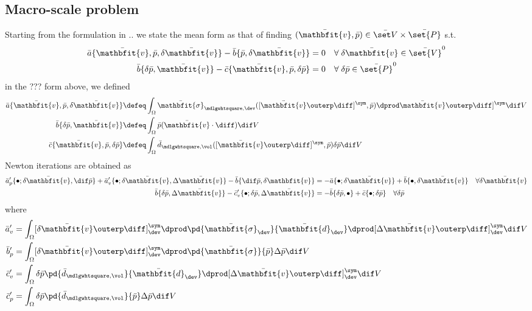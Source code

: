 \documentclass[a4paper,11pt]{article}
\renewcommand{\ta}[1]{\mathbfit{#1}}
\renewcommand{\ts}[1]{\mathbfit{#1}}
\renewcommand{\Box}{\mdlgwhtsquare}
\begin{document}
\subsection{Macro-scale problem}
Starting from the formulation in .. we state the mean form as that of finding $(\bar{\ta v},\bar p) \in \bar{\set V} \times \bar{\set{P}}$ s.t. 
\begin{align}
 \bar a\{\bar{\ta v},\bar p, \delta\bar{\ta v}\} - \bar b\{\bar p, \delta\bar{\ta v}\} &= 0   \quad \forall\; \delta\bar{\ta v} \in \bar{\set{V}}^0\\
 \bar b\{\delta\bar p, \bar{\ta v}\} - \bar c\{\bar{\ta v}, \bar p, \delta\bar p\}&= 0   \quad \forall\; \delta\bar p \in \bar{\set{P}}^0
\end{align}
in the ??? form above, we defined
\begin{align}
 \bar a\{\bar{\ta v},\bar p, \delta\bar{\ta v}\} &\defeq \int_\Omega \bar{\ts\sigma}_{\Box,\dev}([\bar{\ta v}\outerp \diff]^\sym,\bar p)\dprod \bar{\ta v}\outerp \diff]^\sym \dif V \\
 \bar b\{\delta\bar p, \bar{\ta v}\}             &\defeq \int_\Omega \bar p(\bar{\ta v}\cdot\diff)\dif V \\
 \bar c\{\bar{\ta v}, \bar p, \delta\bar p\}     &\defeq \int_\Omega \bar d_{\Box,\vol}([\bar{\ta v}\outerp \diff]^\sym,\bar p)\delta\bar p\dif V
\end{align}
Newton iterations are obtained as
\begin{align}
 \bar{a}'_p\{\bullet; \delta\bar{\ta v},\dif\bar{p}\} + \bar{a}'_v\{\bullet; \delta\bar{\ta v},\Delta\bar{\ta v}\} - \bar{b}\{\dif\bar p, \delta{\ta v}\} &= -\bar{a}\{\bullet; \delta\bar{\ta v}\} + \bar{b}\{\bullet, \delta\bar{\ta v}\}\quad \forall \delta\bar{\ta v}\\
\bar{b}\{\delta\bar p, \Delta\bar{\ta v}\} - \bar{c}'_v\{\bullet; \delta\bar{p}, \Delta\bar{ \ta v}\} &= -\bar{b}\{\delta\bar{p},\bullet\} + \bar{c}\{\bullet;\delta\bar{p}\}\quad \forall \delta\bar{p}
\end{align}
where
\begin{align}
 \bar{a}'_v &= \int_\Omega [\delta\bar{\ta v}\outerp\diff]^\sym_\dev \dprod \pd{\bar{\ts\sigma}_\dev}{\bar{\ts d}_\dev} \dprod [\Delta\bar{\ta v}\outerp\diff]^\sym_\dev \dif V\\
 \bar{b}'_p &= \int_\Omega [\delta\bar{\ta v}\outerp\diff]^\sym_\dev \dprod \pd{\bar{\ts\sigma}}{\bar p} \Delta\bar{p} \dif V\\
 \bar{c}'_v &= \int_\Omega \delta\bar{p} \pd{\bar{d}_{\Box,\vol}}{\bar{\ts d}_\dev} \dprod [\Delta\bar{\ta v}\outerp\diff]^\sym_\dev \dif V\\
 \bar{c}'_p &= \int_\Omega \delta\bar{p} \pd{\bar{d}_{\Box,\vol}}{\bar p} \Delta\bar p\dif V
\end{align}
\end{document}
